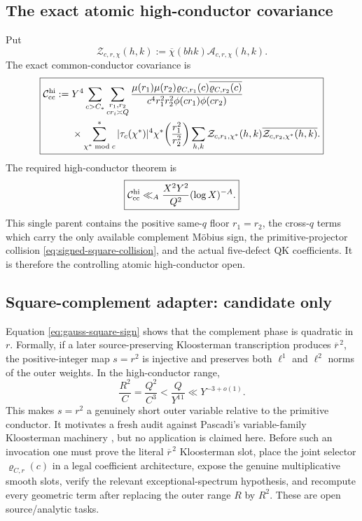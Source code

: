 \documentclass[11pt]{article}
\theoremstyle{definition}
\newcommand{\1}{\mathbf 1}
\begin{document}
\subsection{The exact atomic high-conductor covariance}

Put
\[
 \mathcal Z_{c,r,\chi}(h,k)
 :=
 \overline\chi(bhk)\mathcal A_{c,r,\chi}(h,k).
\]
The exact common-conductor covariance is
\begin{equation}
\boxed{
\begin{aligned}
 \mathcal C_{\rm cc}^{\rm hi}
 :={}&
 Y^4\sum_{c>C_*}
 \sum_{\substack{r_1,r_2\\cr_i\asymp Q}}
 \frac{\mu(r_1)\mu(r_2)
       \varrho_{C,r_1}(c)\overline{\varrho_{C,r_2}(c)}}
      {c^4r_1^2r_2^2\phi(cr_1)\phi(cr_2)}  \\
 &\times
 \sum_{\chi^*\bmod c}^{*}|\tau_c(\chi^*)|^4
 \chi^*\!\left(\frac{r_1^2}{r_2^2}\right)
 \sum_{h,k}
 \mathcal Z_{c,r_1,\chi^*}(h,k)
 \overline{\mathcal Z_{c,r_2,\chi^*}(h,k)}.
\end{aligned}}
\label{eq:cc-hi}
\end{equation}
The required high-conductor theorem is
\begin{equation}
  \boxed{
  \mathcal C_{\rm cc}^{\rm hi}
  \ll_A
  \frac{X^2Y^2}{Q^2}(\log X)^{-A}.
  }
  \label{eq:cc-hi-target}
\end{equation}
This single parent contains the positive same-$q$ floor $r_1=r_2$, the
cross-$q$ terms which carry the only available complement M\"obius sign, the
primitive-projector collision \eqref{eq:signed-square-collision}, and the
actual five-defect QK coefficients.  It is therefore the controlling atomic
high-conductor open.

\subsection{Square-complement adapter: candidate only}

Equation \eqref{eq:gauss-square-sign} shows that the complement phase is
quadratic in $r$.  Formally, if a later source-preserving Kloosterman
transcription produces $\overline r^{\,2}$, the positive-integer map
$s=r^2$ is injective and preserves both $\ell^1$ and $\ell^2$ norms of the
outer weights.  In the high-conductor range,
\[
  \frac{R^2}{C}=\frac{Q^2}{C^3}
  < \frac{Q}{Y^{11}}
  \ll Y^{-3+o(1)}.
\]
This makes $s=r^2$ a genuinely short outer variable relative to the primitive
conductor.  It motivates a fresh audit against Pascadi's variable-family
Kloosterman machinery \cite{Pascadi2025}, but no application is claimed here.
Before such an invocation one must prove the literal $\overline r^{\,2}$
Kloosterman slot, place the joint selector $\varrho_{C,r}(c)$ in a legal
coefficient architecture, expose the genuine multiplicative smooth slots,
verify the relevant exceptional-spectrum hypothesis, and recompute every
geometric term after replacing the outer range $R$ by $R^2$.  These are open
source/analytic tasks.
\end{document}
